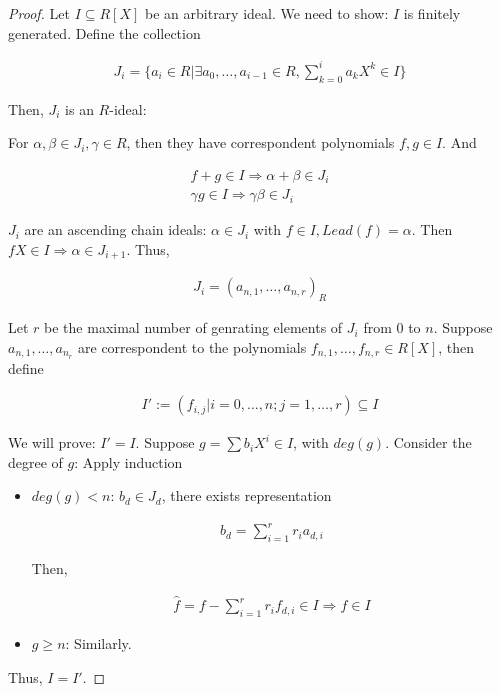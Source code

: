 \documentclass[Total.tex]{subfiles}
\begin{document}
	\begin{proof}
		Let $I\subseteq R[X]$ be an arbitrary ideal. We need to show: $I$ is finitely generated. Define the collection
		
		\begin{gather*}
			J_i=\{a_i\in R|\exists a_0,\dots,a_{i-1}\in R,\sum_{k=0}^i a_k X^k\in I\}
		\end{gather*}
		
		Then, $J_i$ is an $R$-ideal:
		
		For $\alpha,\beta\in J_i,\gamma\in R$, then they have correspondent polynomials $f,g\in I$. And
		
		\begin{gather*}
			f+g\in I\Rightarrow \alpha+\beta\in J_i\\
			\gamma g\in I\Rightarrow \gamma\beta\in J_i
		\end{gather*}
		
		$J_i$ are an ascending chain ideals: $\alpha\in J_i$ with $f\in I,Lead(f)=\alpha$. Then $fX\in I\Rightarrow \alpha\in J_{i+1}$. Thus, 
		
		\begin{gather*}
			J_i=(a_{n,1},\dots,a_{n,r})_{R}
		\end{gather*}
		
		Let $r$ be the maximal number of genrating elements of $J_i$ from $0$ to $n$. Suppose $a_{n,1},\dots,a_{n_r}$ are correspondent to the polynomials $f_{n,1},\dots,f_{n,r}\in R[X]$, then define
		
		\begin{gather*}
			I':=(f_{i,j}|i=0,\dots,n;j=1,\dots,r)\subseteq I
		\end{gather*}
		
		We will prove: $I'=I$. Suppose $g=\sum b_i X^i\in I$, with $deg(g)$. Consider the degree of $g$: Apply induction
		
		\begin{itemize}
			\item $deg(g)<n$: $b_d\in J_d$, there exists representation
			
			\begin{gather*}
				b_d=\sum_{i=1}^r r_i a_{d,i} 
			\end{gather*}
			
			Then,
			
			\begin{gather*}
				\hat{f}=f-\sum_{i=1}^r r_i f_{d,i}\in I\Rightarrow f\in I
			\end{gather*}
			
			\item $g\geq n$: Similarly.
		\end{itemize}
		
		Thus, $I=I'$. 
	\end{proof}
	
\end{document}
